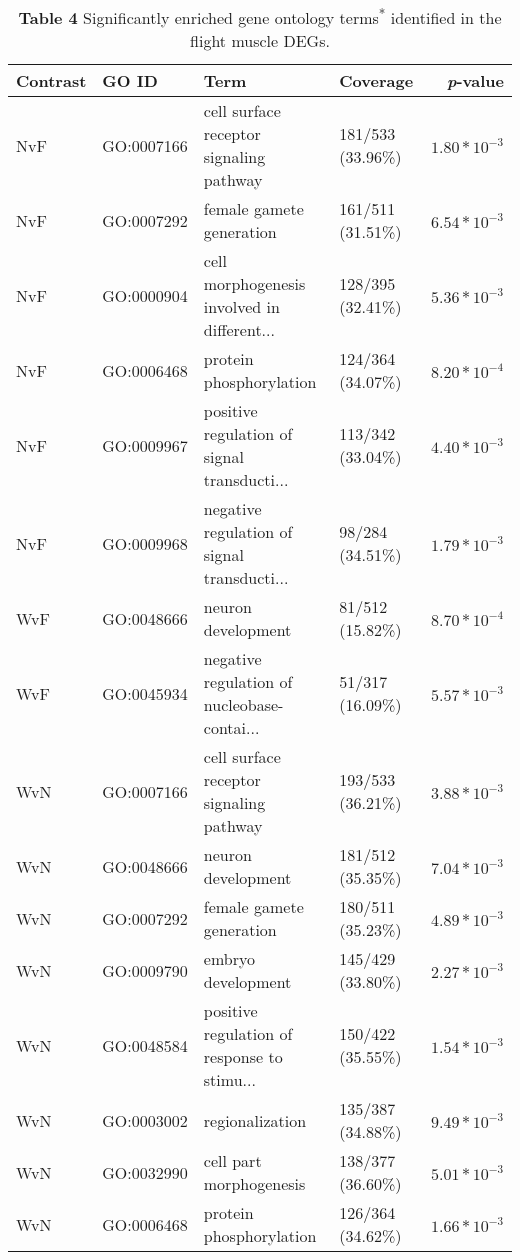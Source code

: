 \documentclass[landscape, 12pt]{article}
\begin{document}
\begin{table}
\centering
\begin{threeparttable}
\caption*{\textbf{Table 4} \quad Significantly enriched gene ontology terms\textsuperscript{*} identified in the flight muscle DEGs.}
\begin{tabular}{llllr}
\rowcolor[rgb]{0.804,0.8,0.8} \textbf{Contrast} & \textbf{GO ID} & \textbf{Term} & \textbf{Coverage} & \textbf{\textit{p}-value}  \\ 
\hline
  NvF & GO:0007166 & cell surface receptor signaling pathway & 181/533 (33.96\%) & $1.80*10^{-3}$ \\ 
  NvF & GO:0007292 & female gamete generation & 161/511 (31.51\%) & $6.54*10^{-3}$ \\ 
  NvF & GO:0000904 & cell morphogenesis involved in different... & 128/395 (32.41\%) & $5.36*10^{-3}$ \\ 
  NvF & GO:0006468 & protein phosphorylation & 124/364 (34.07\%) & $8.20*10^{-4}$ \\ 
  NvF & GO:0009967 & positive regulation of signal transducti... & 113/342 (33.04\%) & $4.40*10^{-3}$ \\ 
  NvF & GO:0009968 & negative regulation of signal transducti... & 98/284 (34.51\%) & $1.79*10^{-3}$ \\ 
  \rowcolor[rgb]{0.949,0.949,0.953} WvF & GO:0048666 & neuron development & 81/512 (15.82\%) & $8.70*10^{-4}$ \\ 
  \rowcolor[rgb]{0.949,0.949,0.953} WvF & GO:0045934 & negative regulation of nucleobase-contai... & 51/317 (16.09\%) & $5.57*10^{-3}$ \\ 
  WvN & GO:0007166 & cell surface receptor signaling pathway & 193/533 (36.21\%) & $3.88*10^{-3}$ \\ 
  WvN & GO:0048666 & neuron development & 181/512 (35.35\%) & $7.04*10^{-3}$ \\ 
  WvN & GO:0007292 & female gamete generation & 180/511 (35.23\%) & $4.89*10^{-3}$ \\ 
  WvN & GO:0009790 & embryo development & 145/429 (33.80\%) & $2.27*10^{-3}$ \\ 
  WvN & GO:0048584 & positive regulation of response to stimu... & 150/422 (35.55\%) & $1.54*10^{-3}$ \\ 
  WvN & GO:0003002 & regionalization & 135/387 (34.88\%) & $9.49*10^{-3}$ \\ 
  WvN & GO:0032990 & cell part morphogenesis & 138/377 (36.60\%) & $5.01*10^{-3}$ \\ 
  WvN & GO:0006468 & protein phosphorylation & 126/364 (34.62\%) & $1.66*10^{-3}$ \\ 

\end{tabular}
\end{threeparttable}
\end{table}
\end{document}
